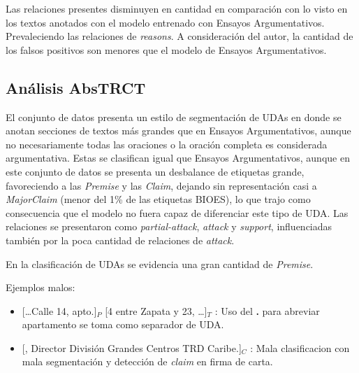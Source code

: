 Las relaciones presentes disminuyen en cantidad en comparación con lo visto en los textos anotados con el modelo 
entrenado con Ensayos Argumentativos. Prevaleciendo las relaciones de \emph{reasons}. A consideración del autor,
la cantidad de los falsos positivos son menores que el modelo de Ensayos Argumentativos.

\subsection{Análisis AbsTRCT}


El conjunto de datos presenta un estilo de segmentación de UDAs en donde se anotan 
secciones de textos más grandes que en Ensayos Argumentativos, aunque no necesariamente 
todas las oraciones o la oración completa es considerada argumentativa. 
Estas se clasifican igual que Ensayos Argumentativos, aunque 
en este conjunto de datos se presenta un desbalance de etiquetas grande, favoreciendo 
a las \emph{Premise} y las \emph{Claim}, dejando sin representación casi a \emph{MajorClaim}
(menor del 1\% de las etiquetas BIOES), lo que trajo como consecuencia que el modelo no fuera 
capaz de diferenciar este tipo de UDA. Las relaciones se presentaron como \emph{partial-attack},
\emph{attack} y \emph{support}, influenciadas también por la poca cantidad de relaciones de \emph{attack}.

En la clasificación de UDAs se evidencia una gran cantidad de \emph{Premise}.

Ejemplos malos:
\begin{itemize}
	\item \text{} [\dots Calle 14, apto.]$_P$ [4 entre Zapata y 23, \dots]$_T$ 
	: Uso del \textbf{.} para abreviar apartamento se toma como separador de UDA. %
	\item \text{} [, Director División Grandes Centros TRD Caribe.]$_C$ 
	: Mala clasificacion con mala segmentación y detección de \emph{claim} en firma de carta. 
\end{itemize}

